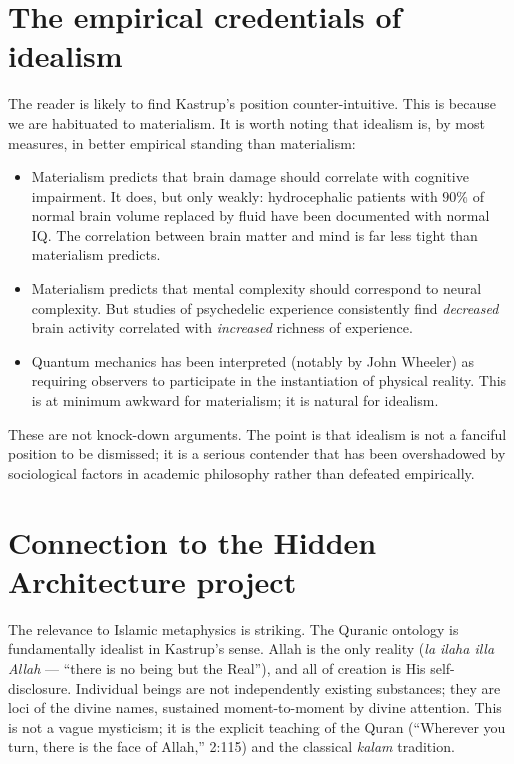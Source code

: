 \documentclass[11pt,a4paper]{book}
\theoremstyle{cleanrm}
\begin{document}
\section{The empirical credentials of idealism}

The reader is likely to find Kastrup's position counter-intuitive.
This is because we are habituated to materialism. It is worth noting
that idealism is, by most measures, in better empirical standing than
materialism:

\begin{itemize}[leftmargin=2em]
    \item Materialism predicts that brain damage should correlate
    with cognitive impairment. It does, but only weakly: hydrocephalic
    patients with $90\%$ of normal brain volume replaced by fluid have
    been documented with normal IQ. The correlation between brain
    matter and mind is far less tight than materialism predicts.
    \item Materialism predicts that mental complexity should
    correspond to neural complexity. But studies of psychedelic
    experience consistently find \emph{decreased} brain activity
    correlated with \emph{increased} richness of experience.
    \item Quantum mechanics has been interpreted (notably by John
    Wheeler) as requiring observers to participate in the
    instantiation of physical reality. This is at minimum awkward for
    materialism; it is natural for idealism.
\end{itemize}

These are not knock-down arguments. The point is that idealism is not
a fanciful position to be dismissed; it is a serious contender that
has been overshadowed by sociological factors in academic philosophy
rather than defeated empirically.

\section{Connection to the Hidden Architecture project}

The relevance to Islamic metaphysics is striking. The Quranic
ontology is fundamentally idealist in Kastrup's sense. Allah is the
only reality (\emph{la ilaha illa Allah} --- ``there is no being but
the Real''), and all of creation is His self-disclosure. Individual
beings are not independently existing substances; they are loci of the
divine names, sustained moment-to-moment by divine attention. This is
not a vague mysticism; it is the explicit teaching of the Quran
(``Wherever you turn, there is the face of Allah,'' 2:115) and the
classical \emph{kalam} tradition.
\end{document}
